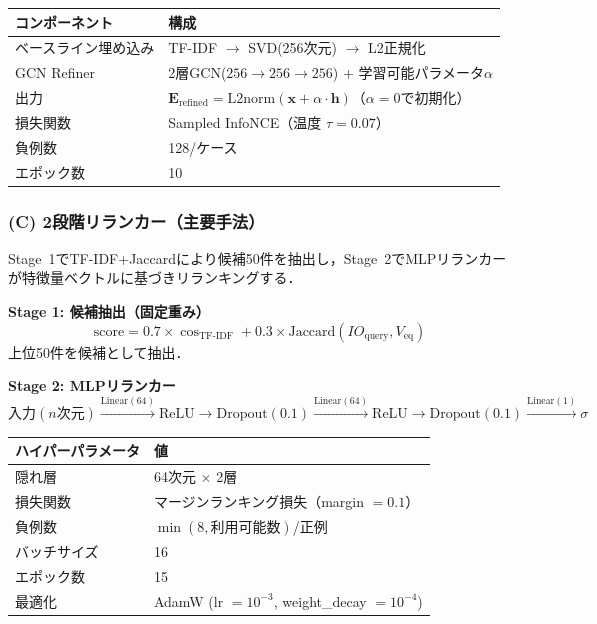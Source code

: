 \documentclass[11pt,a4paper]{ltjsarticle}
\begin{document}
\begin{table}[h]
\centering
\begin{tabular}{ll}
\toprule
コンポーネント & 構成 \\
\midrule
ベースライン埋め込み & TF-IDF $\to$ SVD(256次元) $\to$ L2正規化 \\
GCN Refiner & 2層GCN($256 \to 256 \to 256$) + 学習可能パラメータ$\alpha$ \\
出力 & $\mathbf{E}_{\mathrm{refined}} = \mathrm{L2norm}(\mathbf{x} + \alpha \cdot \mathbf{h})$（$\alpha=0$で初期化） \\
損失関数 & Sampled InfoNCE（温度 $\tau = 0.07$） \\
負例数 & 128/ケース \\
エポック数 & 10 \\
\bottomrule
\end{tabular}
\end{table}

\subsubsection{(C) 2段階リランカー（主要手法）}

Stage~1でTF-IDF+Jaccardにより候補50件を抽出し，Stage~2でMLPリランカーが特徴量ベクトルに基づきリランキングする．

\textbf{Stage 1: 候補抽出（固定重み）}
\begin{equation}
  \mathrm{score} = 0.7 \times \cos_{\mathrm{TF\text{-}IDF}} + 0.3 \times \mathrm{Jaccard}(\mathit{IO}_{\mathrm{query}}, V_{\mathrm{eq}})
\end{equation}
上位50件を候補として抽出．

\textbf{Stage 2: MLPリランカー}
\[
  \text{入力}(n\text{次元}) \xrightarrow{\text{Linear}(64)} \text{ReLU} \to \text{Dropout}(0.1) \xrightarrow{\text{Linear}(64)} \text{ReLU} \to \text{Dropout}(0.1) \xrightarrow{\text{Linear}(1)} \sigma
\]

\begin{table}[h]
\centering
\begin{tabular}{ll}
\toprule
ハイパーパラメータ & 値 \\
\midrule
隠れ層 & 64次元 $\times$ 2層 \\
損失関数 & マージンランキング損失（margin $= 0.1$） \\
負例数 & $\min(8, \text{利用可能数})$/正例 \\
バッチサイズ & 16 \\
エポック数 & 15 \\
最適化 & AdamW (lr $= 10^{-3}$, weight\_decay $= 10^{-4}$) \\
\bottomrule
\end{tabular}
\end{table}
\end{document}
